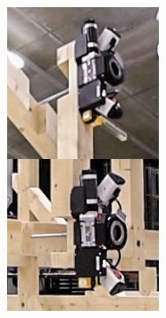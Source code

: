 \begin{figure}[!h]
    \centering
    \begin{subfigure}[b]{0.24\textwidth}
        \centering
        \includegraphics[width=\textwidth]{images/7b/img86.jpg}

\end{subfigure}
\end{figure}
